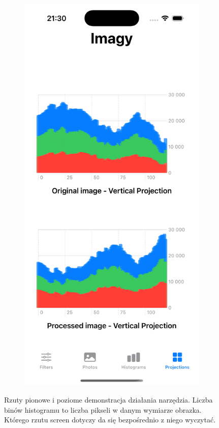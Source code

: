 \documentclass[a4paper]{article}
\begin{document}
\begin{figure}[H]
\begin{subfigure}{0.2\textwidth}
        \label{fig:rzuty_horizontal}
    \end{subfigure}
    \begin{subfigure}{0.2\textwidth}
        \centering
        \includegraphics[width=\linewidth]{images/rzuty_vertical.png}
        \label{fig:rzuty_vertical}
    \end{subfigure}
    \caption{Rzuty pionowe i poziome demonstracja działania narzędzia. Liczba binów histogramu to liczba pikseli w danym wymiarze obrazka. Którego rzutu screen dotyczy da się bezpośrednio z niego wyczytać.}
    \label{fig:rzuty}
\end{figure}
\end{document}
